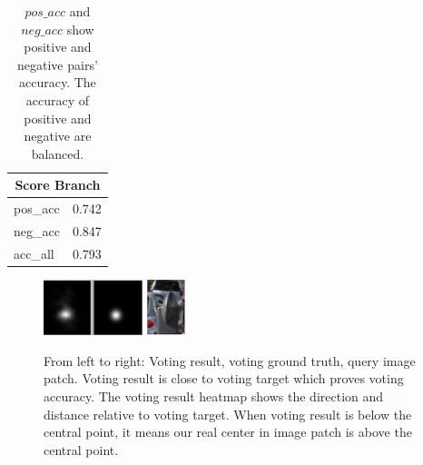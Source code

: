 \documentclass[10pt,twocolumn,letterpaper]{article}
\begin{document}
\begin{table}[h]
	\begin{center}
		\begin{tabular}{ll}
			\multicolumn{2}{c}{Score Branch } \\
			\hline
			pos\_acc &  0.742   \\
			\hline
			neg\_acc &  0.847   \\
			\hline
			acc\_all & 0.793   \\
		\end{tabular}

	\end{center}
	\caption{ $pos\_acc$ and $neg\_acc$ show positive and negative pairs' accuracy. The accuracy of positive and negative are balanced.}
	\label{tab:score_result}
\end{table}


	\begin{figure}[h]
		\begin{center}
		\includegraphics[width=0.258\textwidth]{vote_out2.png}
		\includegraphics[width=0.1\textwidth]{vote_img.png}
		\caption{From left to right: Voting result, voting ground truth, query image patch. Voting result is close to voting target which proves
		voting accuracy. The voting result heatmap shows the direction and distance relative to voting target. When voting result is below the central point, it means our real center in image patch is above the central point.}
		\label{fig:vote_vis}
	\end{center}
	\end{figure}
\end{document}
